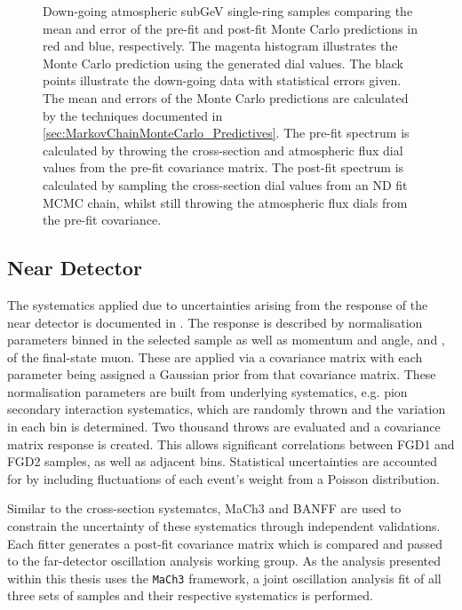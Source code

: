 \begin{figure}[h]
\begin{subfigure}[t]{0.49\textwidth}
  \end{subfigure}
  \caption{Down-going atmospheric subGeV single-ring samples comparing the mean and error of the pre-fit and post-fit Monte Carlo predictions in red and blue, respectively. The magenta histogram illustrates the Monte Carlo prediction using the generated dial values. The black points illustrate the down-going data with statistical errors given. The mean and errors of the Monte Carlo predictions are calculated by the techniques documented in \autoref{sec:MarkovChainMonteCarlo_Predictives}. The pre-fit spectrum is calculated by throwing the cross-section and atmospheric flux dial values from the pre-fit covariance matrix. The post-fit spectrum is calculated by sampling the cross-section dial values from an ND fit MCMC chain, whilst still throwing the atmospheric flux dials from the pre-fit covariance.}
  \label{fig:SelsAndSysts_DownGoingPredictives}
\end{figure}

\subsection{Near Detector}
\label{sec:SelsAndSysts_Systs_ND}

The systematics applied due to uncertainties arising from the response of the near detector is documented in \cite{thesis_clarence}. The response is described by  normalisation parameters binned in the selected sample as well as momentum and angle,  and \quickmath{\cos(\theta_{\mu})}, of the final-state muon. These are applied via a covariance matrix with each parameter being assigned a Gaussian prior from that covariance matrix. These normalisation parameters are built from underlying systematics, e.g. pion secondary interaction systematics, which are randomly thrown and the variation in each  bin is determined. Two thousand throws are evaluated and a covariance matrix response is created. This allows significant correlations between FGD1 and FGD2 samples, as well as adjacent  bins. Statistical uncertainties are accounted for by including fluctuations of each event's weight from a Poisson distribution.

Similar to the cross-section systematcs, MaCh3 and BANFF are used to constrain the uncertainty of these systematics through independent validations. Each fitter generates a post-fit covariance matrix which is compared and passed to the far-detector oscillation analysis working group. As the analysis presented within this thesis uses the \texttt{MaCh3} framework, a joint oscillation analysis fit of all three sets of samples and their respective systematics is performed.


